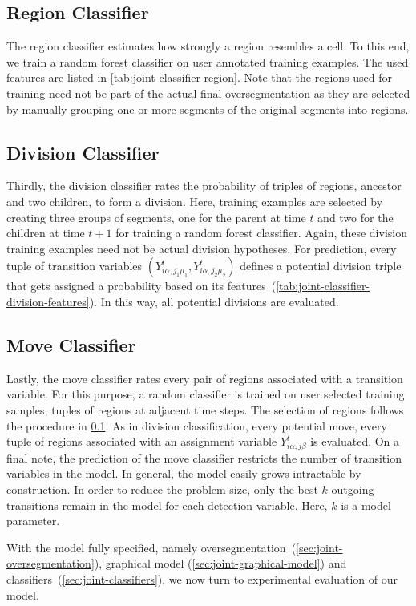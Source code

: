 \subsection{Region Classifier}
\label{sec:joint-classifier-Region}
The region classifier estimates how strongly a region resembles a cell. To this end, we train a
random forest classifier on user annotated training examples. The used features are listed in
\cref{tab:joint-classifier-region}. Note that the regions used for training need not be part of the
actual final oversegmentation as they are selected by manually grouping one or more segments of the
original segments into regions.

\subsection{Division Classifier}
\label{sec:joint-classifier-division}
Thirdly, the division classifier rates the probability of triples of regions, ancestor and two
children, to form a division. Here, training examples are selected by creating three groups of
segments, one for the parent at time $t$ and two for the children at time $t+1$ for training a
random forest classifier. Again, these division training examples need not be actual division
hypotheses. For prediction, every tuple of transition variables
$(Y_{i\alpha,j_1\mu_1}^t,Y_{i\alpha,j_2\mu_2}^t)$ defines a potential division triple that gets assigned a
probability based on its features~(\cf \cref{tab:joint-classifier-division-features}). In this way,
all potential divisions are evaluated.

\subsection{Move Classifier}
\label{sec:joint-classifier-move}
Lastly, the move classifier rates every pair of regions associated with a transition variable. For
this purpose, a random classifier is trained on user selected training samples, \ie tuples of
regions at adjacent time steps. The selection of regions follows the procedure in
\cref{sec:joint-classifier-Region}. As in division classification, every potential move, \ie every
tuple of regions associated with an assignment variable $Y_{i\alpha,j\beta}^t$ is evaluated. On a
final note, the prediction of the move classifier restricts the number of transition variables in
the model. In general, the model easily grows intractable by construction. In order to reduce the
problem size, only the best $k$ outgoing transitions remain in the model for each detection
variable. Here, $k$ is a model parameter.

With the model fully specified, namely oversegmentation~(\cref{sec:joint-oversegmentation}),
graphical model (\cref{sec:joint-graphical-model}) and classifiers~(\cref{sec:joint-classifiers}),
we now turn to experimental evaluation of our model.





